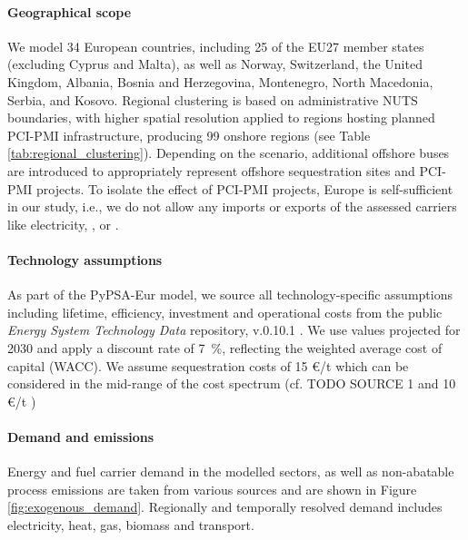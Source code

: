 \documentclass[preprint,12pt,sort&compress]{elsarticle}
\begin{document}
\paragraph{Geographical scope} 
\label{sec:geographical_scope}
We model 34 European countries, including 25 of the EU27 member states (excluding Cyprus and Malta), as well as Norway, Switzerland, the United Kingdom, Albania, Bosnia and Herzegovina, Montenegro, North Macedonia, Serbia, and Kosovo. Regional clustering is based on administrative NUTS boundaries, with higher spatial resolution applied to regions hosting planned PCI-PMI infrastructure, producing 99 onshore regions (see Table \ref{tab:regional_clustering}). Depending on the scenario, additional offshore buses are introduced to appropriately represent offshore sequestration sites and PCI-PMI projects. To isolate the effect of PCI-PMI projects, Europe is self-sufficient in our study, i.e., we do not allow any imports or exports of the assessed carriers like electricity, , or . 

\paragraph{Technology assumptions} 
\label{sec:technology_assumptions}
As part of the PyPSA-Eur model, we source all technology-specific assumptions including lifetime, efficiency, investment and operational costs from the public \textit{Energy System Technology Data} repository, v.0.10.1 \cite{zeyenPyPSATechnologydataV01012025}. We use values projected for 2030 and apply a discount rate of \SI{7}{\percent}, reflecting the weighted average cost of capital (WACC). We assume  sequestration costs of 15 \euro{}/t which can be considered in the mid-range of the cost spectrum (cf. TODO SOURCE 1 and 10 \euro{}/t \cite{hofmannH2CO2Network2025}) 

\paragraph{Demand and  emissions}
\label{sec:demand_and_co2_emissions}
Energy and fuel carrier demand in the modelled sectors, as well as non-abatable  process emissions are taken from various sources \cite{mantzosJRCIDEES20152018,eurostatCompleteEnergyBalances2022,manzGeoreferencedIndustrialSites2018,muehlenpfordtTimeSeries2019,krienOemofDemandlibV0222025} and are shown in Figure \ref{fig:exogenous_demand}. Regionally and temporally resolved demand includes electricity, heat, gas, biomass and transport. 
\end{document}
